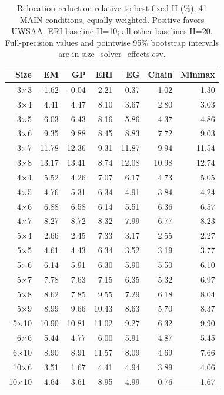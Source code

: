 \begin{table}[t]
\centering\scriptsize
\caption{Relocation reduction relative to best fixed H (\%); 41 MAIN conditions, equally weighted. Positive favors UWSAA. ERI baseline H=10; all other baselines H=20. Full-precision values and pointwise 95\% bootstrap intervals are in size_solver_effects.csv.}
\setlength{\tabcolsep}{4pt}
\begin{tabular}{rrrrrrr}
\toprule
Size & EM & GP & ERI & EG & Chain & Minmax \\
\midrule
3$\times$3 & -1.62 & -0.04 & 2.21 & 0.37 & -1.02 & -1.30 \\
3$\times$4 & 4.41 & 4.47 & 8.10 & 3.67 & 2.80 & 3.03 \\
3$\times$5 & 6.03 & 6.43 & 8.16 & 5.86 & 4.37 & 4.86 \\
3$\times$6 & 9.35 & 9.88 & 8.45 & 8.83 & 7.72 & 9.03 \\
3$\times$7 & 11.78 & 12.36 & 9.31 & 11.87 & 9.94 & 11.54 \\
3$\times$8 & 13.17 & 13.41 & 8.74 & 12.08 & 10.98 & 12.74 \\
4$\times$4 & 5.52 & 4.26 & 7.07 & 6.17 & 4.73 & 5.05 \\
4$\times$5 & 4.76 & 5.31 & 6.34 & 4.91 & 3.84 & 4.24 \\
4$\times$6 & 6.88 & 6.58 & 6.14 & 5.51 & 6.36 & 6.57 \\
4$\times$7 & 8.27 & 8.72 & 8.32 & 7.99 & 6.77 & 8.23 \\
5$\times$4 & 2.66 & 2.45 & 7.33 & 3.17 & 2.55 & 2.27 \\
5$\times$5 & 4.61 & 4.43 & 6.34 & 3.52 & 3.19 & 3.77 \\
5$\times$6 & 6.14 & 5.91 & 6.30 & 5.90 & 5.50 & 6.10 \\
5$\times$7 & 7.78 & 7.63 & 7.15 & 6.35 & 5.32 & 6.97 \\
5$\times$8 & 8.62 & 7.85 & 9.55 & 7.29 & 6.18 & 8.04 \\
5$\times$9 & 8.99 & 9.66 & 10.43 & 8.63 & 5.70 & 8.37 \\
5$\times$10 & 10.90 & 10.81 & 11.02 & 9.27 & 6.32 & 9.90 \\
6$\times$6 & 5.44 & 4.77 & 6.00 & 5.91 & 4.87 & 5.45 \\
6$\times$10 & 8.90 & 8.91 & 11.57 & 8.09 & 4.69 & 7.66 \\
10$\times$6 & 3.51 & 1.67 & 4.41 & 4.94 & 3.89 & 4.06 \\
10$\times$10 & 4.64 & 3.61 & 8.95 & 4.99 & -0.76 & 1.67 \\
\bottomrule
\end{tabular}
\end{table}